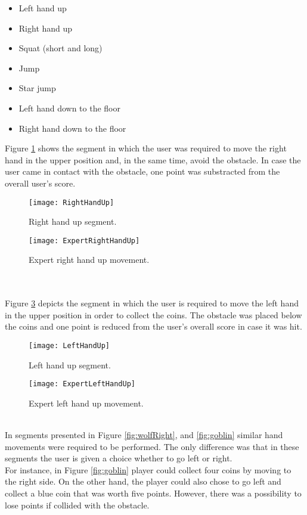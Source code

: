 \begin{itemize}
\item Left hand up
\item Right hand up
\item Squat (short and long)
\item Jump
\item Star jump
\item Left hand down to the floor
\item Right hand down to the floor
\end{itemize}
Figure \ref{fig:rightup} shows the segment in which the user was required to move the right hand in the upper position and, in the same time, avoid the obstacle. In case the user came in contact with the obstacle, one point was substracted from the overall user's score.\\
\begin{figure}[h]
    \centering
    \texttt{[image: RightHandUp]}
    \caption{Right hand up segment.}
    \label{fig:rightup}
\end{figure}
\begin{figure}[h]
    \centering
    \texttt{[image: ExpertRightHandUp]}
    \caption{Expert right hand up movement.}
    \label{fig:expertRightHandUp}
\end{figure}\\\\
Figure \ref{fig:leftup} depicts the segment in which the user is required to move the left hand in the upper position in order to collect the coins. The obstacle was placed below the coins and one point is reduced from the user's overall score in case it was hit.\\
\begin{figure}[h]
    \centering
    \texttt{[image: LeftHandUp]}
    \caption{Left hand up segment.}
    \label{fig:leftup}
\end{figure}
\begin{figure}[h]
    \centering
    \texttt{[image: ExpertLeftHandUp]}
    \caption{Expert left hand up movement.}
    \label{fig:leftHandUp}
\end{figure}\\
In segments presented in Figure \ref{fig:wolfRight}, and \ref{fig:goblin} similar hand movements were required to be performed. The only difference was that in these segments the user is given a choice whether to go left or right. \\For instance, in Figure \ref{fig:goblin} player could collect four coins by moving to the right side. On the other hand, the player could also chose to go left and collect a blue coin that was worth five points. However, there was a possibility to lose points if collided with the obstacle.\\
